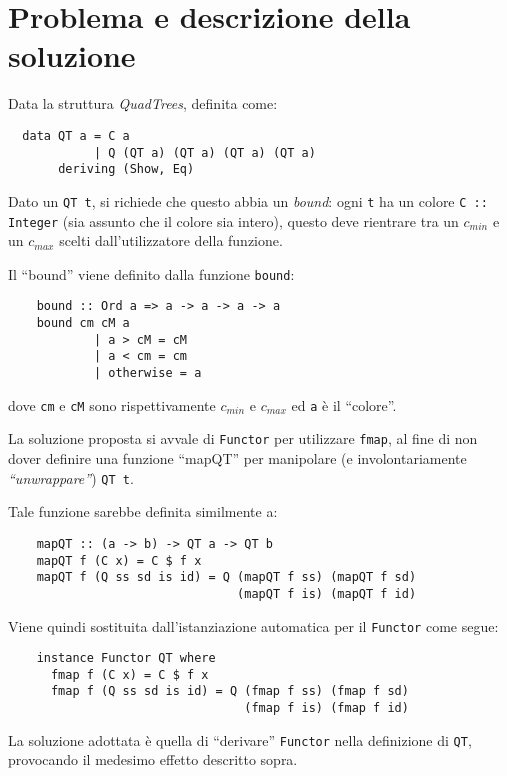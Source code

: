 \documentclass[a4paper,italian]{article}
\begin{document}

\setcounter{page}{1}

\section*{Problema e descrizione della soluzione}
Data la struttura \textit{QuadTrees}, definita come:

\begin{verbatim}
  data QT a = C a 
            | Q (QT a) (QT a) (QT a) (QT a)
       deriving (Show, Eq)
\end{verbatim}

Dato un \texttt{QT t}, si richiede che questo abbia un \textit{bound}: ogni \texttt{t} ha un colore \texttt{C :: Integer} (sia assunto che il colore sia intero), questo deve rientrare tra un $c_{min}$ e un $c_{max}$ scelti dall'utilizzatore della funzione.

Il ``bound'' viene definito dalla funzione \texttt{bound}:
\begin{verbatim}
	bound :: Ord a => a -> a -> a -> a
	bound cm cM a 
            | a > cM = cM
            | a < cm = cm
            | otherwise = a
\end{verbatim}
dove \texttt{cm} e \texttt{cM} sono rispettivamente $c_{min}$ e $c_{max}$ ed \texttt{a} è il ``colore''.

La soluzione proposta si avvale di \texttt{Functor} per utilizzare \texttt{fmap}, al fine di non dover definire una funzione ``mapQT'' per manipolare (e involontariamente \textit{``unwrappare''}) \texttt{QT t}.

Tale funzione sarebbe definita similmente a:
\begin{verbatim}
    mapQT :: (a -> b) -> QT a -> QT b
    mapQT f (C x) = C $ f x
    mapQT f (Q ss sd is id) = Q (mapQT f ss) (mapQT f sd)
                                (mapQT f is) (mapQT f id)
\end{verbatim}

Viene quindi sostituita dall'istanziazione automatica per il \texttt{Functor} come segue:
\begin{verbatim}
    instance Functor QT where
      fmap f (C x) = C $ f x
      fmap f (Q ss sd is id) = Q (fmap f ss) (fmap f sd)
                                 (fmap f is) (fmap f id)
\end{verbatim}
La soluzione adottata è quella di ``derivare'' \texttt{Functor} nella definizione di \texttt{QT}, provocando il medesimo effetto descritto sopra.
\end{document}
